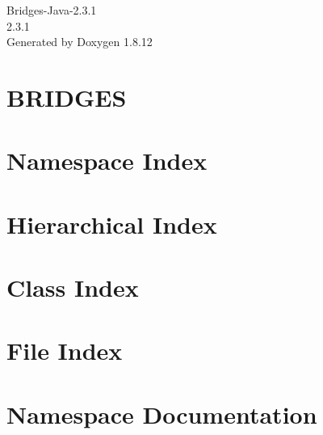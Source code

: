 \documentclass[twoside]{book}
\newcommand{\+}{\discretionary{\mbox{\scriptsize$\hookleftarrow$}}{}{}}
\newcommand{\clearemptydoublepage}{%
  \newpage{\pagestyle{empty}\cleardoublepage}%
}
\begin{document}
\hypersetup{pageanchor=false,
             bookmarksnumbered=true,
             pdfencoding=unicode
            }
\begin{titlepage}
\vspace*{7cm}
\begin{center}%
{\Large Bridges-\/\+Java-\/2.3.1 \\[1ex]\large 2.\+3.\+1 }\\
\vspace*{1cm}
{\large Generated by Doxygen 1.8.12}\\
\end{center}
\end{titlepage}
\clearemptydoublepage
{}
\tableofcontents
\clearemptydoublepage
{}
\hypersetup{pageanchor=true}

\chapter{B\+R\+I\+D\+G\+ES}
\label{index}\hypertarget{index}{}
\chapter{Namespace Index}

\chapter{Hierarchical Index}

\chapter{Class Index}

\chapter{File Index}

\chapter{Namespace Documentation}





\end{document}
